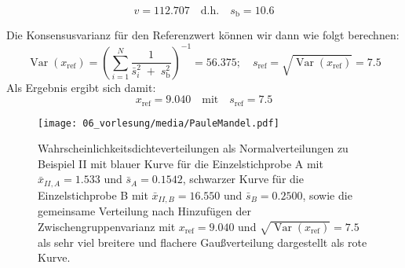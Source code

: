 $$
v = 112.707 \quad \text{d.h.} \quad s_\mathrm{b} = 10.6
$$

\begin{comment}
\textcolor{red}{ich werde hier noch einen Plot erzeugen, der die Gaußverteilungen der
beiden Einzelstichproben zeigt (vielleicht außerdem noch die t-Verteilungen) sowie die
Gaußverteilung ${\cal N}(x_\mathrm{ref} = 9.040, s_\mathrm{b} = 10.6)$ für die
Zwischengruppenverteilung.}
\end{comment}
Die Konsensusvarianz für den Referenzwert können wir dann wie folgt berechnen:
$$
\operatorname{Var}(x_\mathrm{ref}) = \left(\sum\limits_{i=1}^N \frac{1}{\bar s^2_i \; + \; s^2_\mathrm{b}}\right)^{-1}
= 56.375;  \quad s_\mathrm{ref} = \sqrt{\operatorname{Var}(x_\mathrm{ref})} = 7.5
$$
Als Ergebnis ergibt sich damit:
\begin{equation}
x_\mathrm{ref} = 9.040 \quad \text{mit} \quad
s_\mathrm{ref} = 7.5
\end{equation}

\begin{figure}[!htp]
	\begin{center}
		\texttt{[image: 06\_vorlesung/media/PauleMandel.pdf]}
		\caption{Wahrscheinlichkeitsdichteverteilungen als Normalverteilungen
  zu Beispiel II mit blauer Kurve für die Einzelstichprobe A mit $\bar x_{II,A} = 1.533$
  und $\bar s_A = 0.1542$, schwarzer Kurve für die Einzelstichprobe B mit $\bar x_{II,B} = 16.550$
  und $\bar s_B = 0.2500$, sowie die gemeinsame Verteilung nach Hinzufügen der Zwischengruppenvarianz mit
  $x_\mathrm{ref} = 9.040$ und $\sqrt{\operatorname{Var}(x_\mathrm{ref})} = 7.5$ als sehr viel breitere und
  flachere Gaußverteilung dargestellt als rote Kurve.}
		\label{fig:Pau82BeispielII}
	\end{center}
\end{figure}

